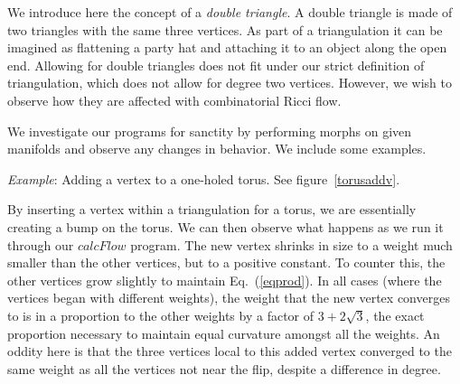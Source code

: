 \documentclass[12pt]{article}
\begin{document}
 We introduce here the concept of a \textit{double triangle}. A double triangle is made of two triangles with the same three vertices. As part of a triangulation it can be imagined as flattening a party hat and attaching it to an object along the open end. Allowing for double triangles does not fit under our strict definition of triangulation, which does not allow for degree two vertices. However, we wish to observe how they are affected with combinatorial Ricci flow.


 We investigate our programs for sanctity by performing morphs on given manifolds and observe any changes in behavior. We include some examples. 

 \textit{Example}: Adding a vertex to a one-holed torus. See figure~\ref{torusaddv}. 

 By inserting a vertex within a triangulation for a torus, we are essentially creating a bump on the torus. We can then observe what happens as we run it through our $calcFlow$ program. The new vertex shrinks in size to a weight much smaller than the other vertices, but to a positive constant. To counter this, the other vertices grow slightly to maintain Eq.~(\ref{eqprod}). In all cases (where the vertices began with different weights), the weight that the new vertex converges to is in a proportion to the other weights by a factor of $3+2\sqrt{3}$, the exact proportion necessary to maintain equal curvature amongst all the weights. An oddity here is that the three vertices local to this added vertex converged to the same weight as all the vertices not near the flip, despite a difference in degree.
\end{document}
